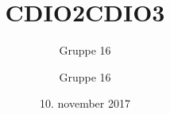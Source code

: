 \documentclass[12pt,a4paper]{article}
\title{CDIO2}
\author{Gruppe 16}
\date{10. november 2017}
\author{Gruppe 16}
\title{CDIO3}
\begin{document}
        
        \pagebreak
        
        \pagebreak
        
        \pagebreak
        
        \pagebreak
        
        \pagebreak
    
\end{document}
